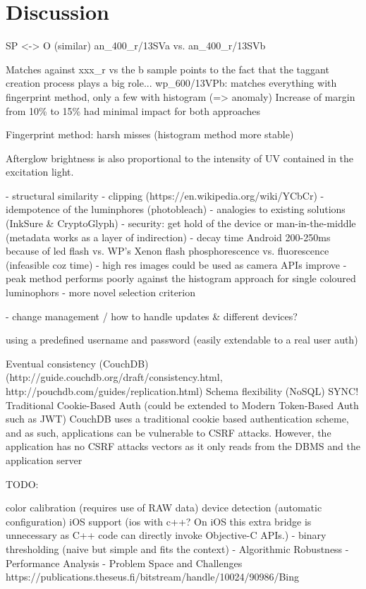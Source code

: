 \documentclass[thesis.tex]{subfiles}
\begin{document}
\chapter{Discussion}
\label{chapter:discussion}

SP <-> O (similar)
an\_400\_r/13SVa vs. an\_400\_r/13SVb

Matches against xxx\_r vs the b sample points to the fact that the taggant creation process plays a big role...
wp\_600/13VPb: matches everything with fingerprint method, only a few with histogram (=> anomaly)
Increase of margin from 10\% to 15\% had minimal impact for both approaches

Fingerprint method: harsh misses (histogram method more stable)

Afterglow brightness is also proportional to the intensity of UV contained in the excitation light.

- structural similarity
- clipping (https://en.wikipedia.org/wiki/YCbCr)
- idempotence of the luminphores (photobleach)
- analogies to existing solutions (InkSure \& CryptoGlyph)
- security: get hold of the device or man-in-the-middle (metadata works as a layer of indirection)
- decay time Android 200-250ms because of led flash vs. WP's Xenon flash
phosphorescence vs. fluorescence (infeasible coz time)
- high res images could be used as camera APIs improve
- peak method performs poorly against the histogram approach for single coloured luminophors
- more novel selection criterion

- change management / how to handle updates \& different devices?

using a predefined username and password (easily extendable to a real user auth)

Eventual consistency (CouchDB) (http://guide.couchdb.org/draft/consistency.html, http://pouchdb.com/guides/replication.html)
Schema flexibility (NoSQL) SYNC!
Traditional Cookie-Based Auth (could be extended to Modern Token-Based Auth such as JWT)
CouchDB uses a traditional cookie based authentication scheme, and as such, applications can be vulnerable to CSRF attacks. However, the application has no CSRF attacks vectors as it only reads from the DBMS and the application server

TODO:

color calibration (requires use of RAW data)
device detection (automatic configuration)
iOS support (ios with c++? On iOS this extra bridge is unnecessary as C++ code can directly invoke Objective-C APIs.)
- binary thresholding (naive but simple and fits the context)
- Algorithmic Robustness
- Performance Analysis
- Problem Space and Challenges
https://publications.theseus.fi/bitstream/handle/10024/90986/Bing%
\end{document}
